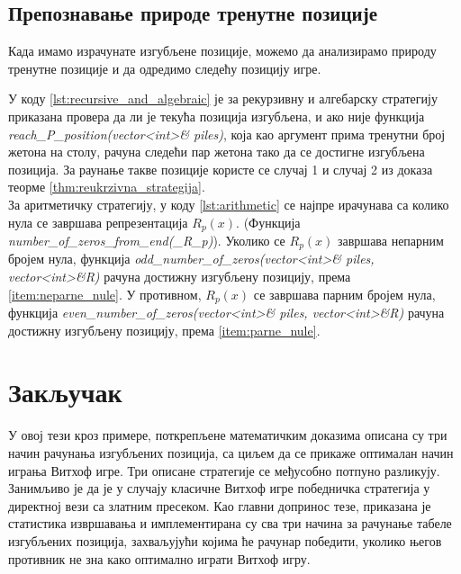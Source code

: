 \documentclass[a4paper]{article}
\begin{document}
\subsection{Препознавање природе тренутне позиције}

Када имамо израчунате изгубљене позиције, можемо да анализирамо природу тренутне позиције и да одредимо следећу позицију игре.

У коду \ref{lst:recursive_and_algebraic} је за рекурзивну и алгебарску стратегију приказана провера да ли је текућа позиција изгубљена, и ако није функција \textit{reach\_P\_position(vector<int>\& piles)}, која као аргумент прима тренутни број жетона на столу, рачуна следећи пар жетона тако да се достигне изгубљена позиција. За раунање такве позиције користе се случај 1 и случај 2 из доказа теорме \ref{thm:reukrzivna_strategija}.\\
За аритметичку стратегију, у коду \ref{lst:arithmetic} се најпре ирачунава са колико нула се завршава репрезентација $ R_{p}(x) $. (Функција \textit{number\_of\_zeros\_from\_end(\_R\_{p})}). Уколико се $ R_{p}(x) $ завршава непарним бројем нула, функција \textit{odd\_number\_of\_zeros(vector<int>\& piles, vector<int>\&R)} рачуна достижну изгубљену позицију, према \ref{item:neparne_nule}. У противном, $ R_{p}(x) $ се завршава парним бројем нула, функција \textit{even\_number\_of\_zeros(vector<int>\& piles, vector<int>\&R)} рачуна достижну изгубљену позицију, према \ref{item:parne_nule}.





\newpage

\section{Закључак}
\label{sec:zakljucak}

У овој тези кроз примере, поткрепљене математичким доказима описана су три начин рачунања изгубљених позиција, са циљем да се прикаже оптималан начин играња Витхоф игре. Три описане стратегије се међусобно потпуно разликују. Занимљиво је да је у случају класичне Витхоф игре победничка стратегија у директној вези са златним пресеком. Као главни допринос тезе, приказана је статистика извршавања и имплементирана су сва три начина за рачунање табеле изгубљених позиција,  захваљујући којима ће рачунар победити, уколико његов противник не зна како оптимално играти Витхоф игру.
\end{document}
